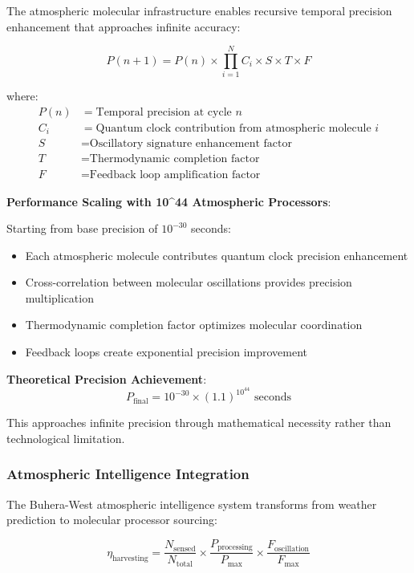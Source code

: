 \documentclass[12pt,a4paper]{article}
\begin{document}
The atmospheric molecular infrastructure enables recursive temporal precision enhancement that approaches infinite accuracy:

\begin{equation}
P(n+1) = P(n) \times \prod_{i=1}^{N} C_i \times S \times T \times F
\end{equation}

where:
\begin{align}
P(n) &= \text{Temporal precision at cycle } n \\
C_i &= \text{Quantum clock contribution from atmospheric molecule } i \\
S &= \text{Oscillatory signature enhancement factor} \\
T &= \text{Thermodynamic completion factor} \\
F &= \text{Feedback loop amplification factor}
\end{align}

\textbf{Performance Scaling with 10^44 Atmospheric Processors}:

Starting from base precision of $10^{-30}$ seconds:
\begin{itemize}
\item Each atmospheric molecule contributes quantum clock precision enhancement
\item Cross-correlation between molecular oscillations provides precision multiplication
\item Thermodynamic completion factor optimizes molecular coordination
\item Feedback loops create exponential precision improvement
\end{itemize}

\textbf{Theoretical Precision Achievement}:
\begin{equation}
P_{\text{final}} = 10^{-30} \times (1.1)^{10^{44}} \text{ seconds}
\end{equation}

This approaches infinite precision through mathematical necessity rather than technological limitation.

\subsubsection{Atmospheric Intelligence Integration}

The Buhera-West atmospheric intelligence system transforms from weather prediction to molecular processor sourcing:

\begin{equation}
\eta_{\text{harvesting}} = \frac{N_{\text{sensed}}}{N_{\text{total}}} \times \frac{P_{\text{processing}}}{P_{\text{max}}} \times \frac{F_{\text{oscillation}}}{F_{\text{max}}}
\end{equation}
\end{document}
